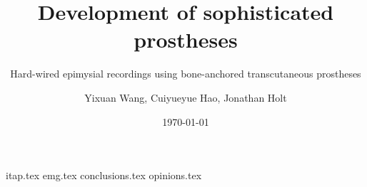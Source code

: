 \documentclass[final]{beamer}
\title{Development of sophisticated prostheses}
\subtitle{Hard-wired epimysial recordings using bone-anchored transcutaneous prostheses}
\author{Yixuan Wang, Cuiyueyue Hao, Jonathan Holt}
\date{\today}
\begin{document}
	\begin{frame}
		\titlepage
	\end{frame}

	{itap.tex}
	{emg.tex}
	{conclusions.tex}
	{opinions.tex}

	\begin{frame}
	\end{frame}
\end{document}
